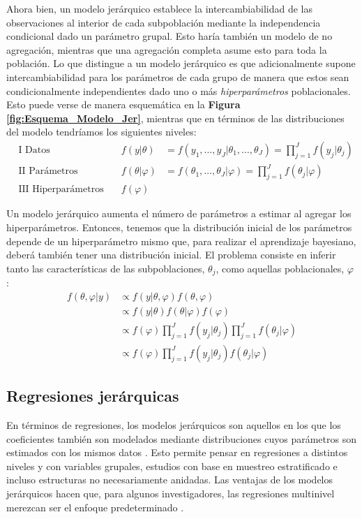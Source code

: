 Ahora bien, un modelo jerárquico establece la intercambiabilidad de las observaciones al interior de cada subpoblación mediante la independencia condicional dado un parámetro grupal. Esto haría también un modelo de no agregación, mientras que una agregación completa asume esto para toda la población. Lo que distingue a un modelo jerárquico es que adicionalmente supone intercambiabilidad para los parámetros de cada grupo de manera que estos sean condicionalmente independientes dado uno o más \textit{hiperparámetros} poblacionales. Esto puede verse de manera esquemática en la \textbf{Figura \ref{fig:Esquema_Modelo_Jer}}, mientras que en términos de las distribuciones del modelo tendríamos los siguientes niveles: 
\begin{align*}
&\text{I Datos} \quad & f(y|\theta)&=f(y_1,\dots,y_J|\theta_1,\dots,\theta_J)=\prod\limits_{j=1}^Jf(y_j|\theta_j) \\
&\text{II Parámetros} \quad & f(\theta|\varphi)&=f(\theta_1,\dots,\theta_J|\varphi) = \prod\limits_{j=1}^Jf(\theta_j|\varphi)  \\
&\text{III Hiperparámetros} \quad & f(\varphi)&
\end{align*}

Un modelo jerárquico aumenta el número de parámetros a estimar al agregar los hiperparámetros. Entonces, tenemos que la distribución inicial de los parámetros depende de un hiperparámetro mismo que, para realizar el aprendizaje bayesiano, deberá también tener una distribución inicial. El problema consiste en inferir tanto las características de las subpoblaciones, $\theta_j$, como aquellas poblacionales, $\varphi$ \parencite{GP98}: 
\begin{align*}
f(\theta,\varphi|y) & \propto f(y|\theta,\varphi)f(\theta,\varphi) \\
&\propto f(y|\theta)f(\theta|\varphi)f(\varphi) \\
&\propto f(\varphi)\prod\limits_{j=1}^Jf(y_j|\theta_j)\prod\limits_{j=1}^Jf(\theta_j|\varphi) \\
&\propto f(\varphi)\prod\limits_{j=1}^Jf(y_j|\theta_j)f(\theta_j|\varphi)
\end{align*}

\subsection{Regresiones jerárquicas}

En términos de regresiones, los modelos jerárquicos son aquellos en los que los coeficientes también son modelados mediante distribuciones cuyos parámetros son estimados con los mismos datos \parencite{GelmanHill06}. Esto permite pensar en regresiones a distintos niveles y con variables grupales, estudios con base en muestreo estratificado e incluso estructuras no necesariamente anidadas. Las ventajas de los modelos jerárquicos hacen que, para algunos investigadores, las regresiones multinivel merezcan ser el enfoque predeterminado \parencite{McElreath15}.\\

